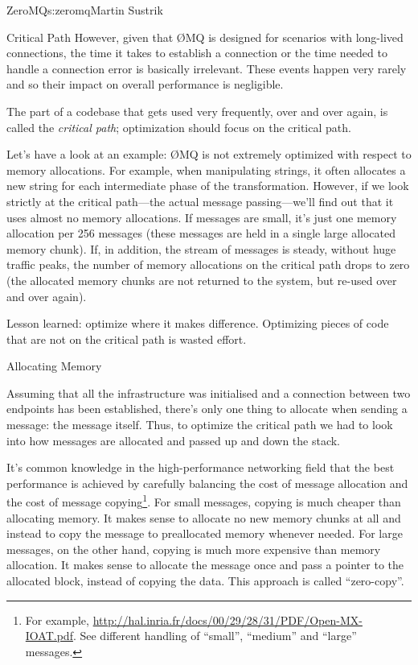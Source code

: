 \begin{aosachapter}{ZeroMQ}{s:zeromq}{Martin Sustrik}
\begin{aosasect1}{Critical Path}
However, given that {\O}MQ is designed for scenarios with long-lived
connections, the time it takes to establish a connection or the time
needed to handle a connection error is basically irrelevant. These
events happen very rarely and so their impact on overall performance
is negligible.

The part of a codebase that gets used very frequently, over and over
again, is called the \emph{critical path}; optimization should focus on
the critical path.

Let's have a look at an example: {\O}MQ is not extremely optimized with
respect to memory allocations. For example, when manipulating strings,
it often allocates a new string for each intermediate phase of the
transformation. However, if we look strictly at the critical path---the
actual message passing---we'll find out that it uses almost no memory
allocations. If messages are small, it's just one memory allocation
per 256 messages (these messages are held in a single large allocated
memory chunk). If, in addition, the stream of messages is steady,
without huge traffic peaks, the number of memory allocations on the
critical path drops to zero (the allocated memory chunks are not
returned to the system, but re-used over and over again).

Lesson learned: optimize where it makes difference. Optimizing pieces
of code that are not on the critical path is wasted effort.

\end{aosasect1}

\begin{aosasect1}{Allocating Memory}

Assuming that all the infrastructure was initialised and a connection
between two endpoints has been established, there's only one thing
to allocate when sending a message: the message itself. Thus, to
optimize the critical path we had to look into how messages are
allocated and passed up and down the stack.

It's common knowledge in the high-performance networking field that the best
performance is achieved by carefully balancing the cost of message
allocation and the cost of message copying\footnote{For example,
  \url{http://hal.inria.fr/docs/00/29/28/31/PDF/Open-MX-IOAT.pdf}.
  See different handling of ``small'', ``medium'' and ``large''
  messages.}. For small messages, copying is much cheaper than
allocating memory. It makes sense to allocate no new memory chunks at
all and instead to copy the message to preallocated memory whenever
needed. For large messages, on the other hand, copying is much more
expensive than memory allocation. It makes sense to allocate the
message once and pass a pointer to the allocated block, instead of
copying the data. This approach is called ``zero-copy''.


\end{aosasect1}
\end{aosachapter}
